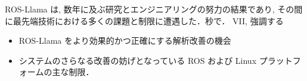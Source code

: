 \begin{frame}{}
    ROS-Llama は, 数年に及ぶ研究とエンジニアリングの努力の結果であり, その間に最先端技術における多くの課題と制限に遭遇した．秒で． VII, 強調する

    \begin{itemize}
        \item  ROS-Llama をより効果的かつ正確にする解析改善の機会

        \item  システムのさらなる改善の妨げとなっている ROS および Linux プラットフォームの主な制限．

    \end{itemize}
\end{frame}
